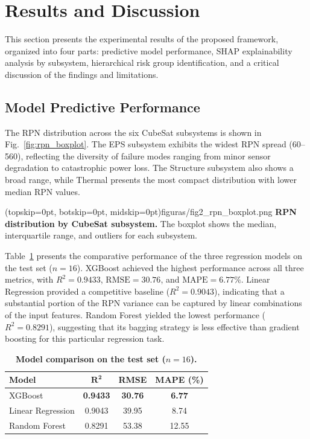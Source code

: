\section{Results and Discussion}
\label{sec:results}

This section presents the experimental results of the proposed framework, organized into four parts: predictive model performance, SHAP explainability analysis by subsystem, hierarchical risk group identification, and a critical discussion of the findings and limitations.

\subsection{Model Predictive Performance}
\label{subsec:model_performance}

The RPN distribution across the six CubeSat subsystems is shown in Fig.~\ref{fig:rpn_boxplot}. The EPS subsystem exhibits the widest RPN spread (60--560), reflecting the diversity of failure modes ranging from minor sensor degradation to catastrophic power loss. The Structure subsystem also shows a broad range, while Thermal presents the most compact distribution with lower median RPN values.

\Figure[t!](topskip=0pt, botskip=0pt, midskip=0pt){figuras/fig2_rpn_boxplot.png}
{\textbf{RPN distribution by CubeSat subsystem.} The boxplot shows the median, interquartile range, and outliers for each subsystem.\label{fig:rpn_boxplot}}

Table~\ref{tab:model_comparison} presents the comparative performance of the three regression models on the test set ($n=16$). XGBoost achieved the highest performance across all three metrics, with $R^2 = 0.9433$, $\text{RMSE} = 30.76$, and $\text{MAPE} = 6.77\%$. Linear Regression provided a competitive baseline ($R^2 = 0.9043$), indicating that a substantial portion of the RPN variance can be captured by linear combinations of the input features. Random Forest yielded the lowest performance ($R^2 = 0.8291$), suggesting that its bagging strategy is less effective than gradient boosting for this particular regression task.

\begin{table}[h]
\caption{\textbf{Model comparison on the test set ($n=16$).}}
\label{tab:model_comparison}
\centering
\begin{tabular}{lccc}
\hline
\textbf{Model} & $\boldsymbol{R^2}$ & \textbf{RMSE} & \textbf{MAPE (\%)} \\
\hline
XGBoost           & \textbf{0.9433} & \textbf{30.76} & \textbf{6.77} \\
Linear Regression & 0.9043          & 39.95          & 8.74 \\
Random Forest     & 0.8291          & 53.38          & 12.55 \\
\hline
\end{tabular}
\end{table}

